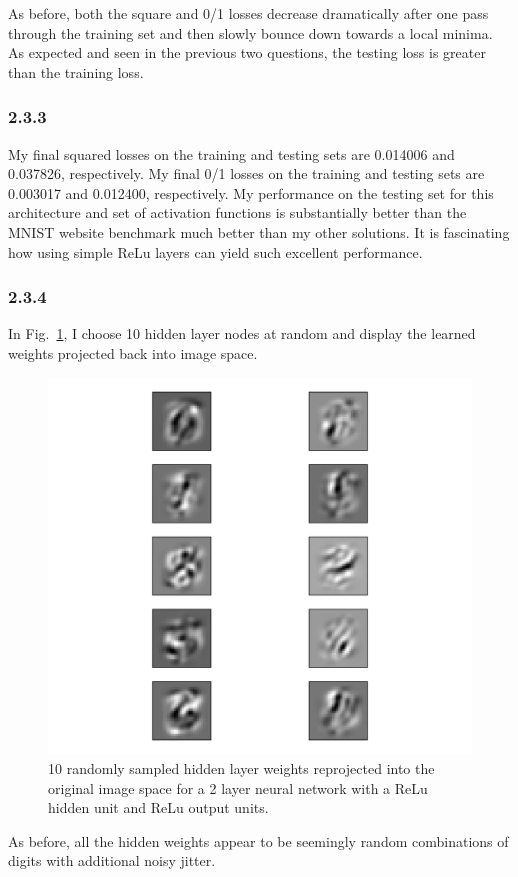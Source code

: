 \documentclass[12pt]{amsart}
\begin{document}
As before, both the square and 0/1 losses decrease dramatically after one pass through the training set and then slowly bounce down towards a local minima.  As expected and seen in the previous two questions, the testing loss is greater than the training loss.

\subsubsection*{2.3.3}
My final squared losses on the training and testing sets are 0.014006 and 0.037826, respectively.  My final 0/1 losses on the training and testing sets are 0.003017 and 0.012400, respectively.  My performance on the testing set for this architecture and set of activation functions is substantially better than the MNIST website benchmark much better than my other solutions.  It is fascinating how using simple ReLu layers can yield such excellent performance.

\subsubsection*{2.3.4}
In Fig.~\ref{fig:relu_relu_hidden}, I choose 10 hidden layer nodes at random and display the learned weights projected back into image space.
\begin{figure}[H]
	\includegraphics[width=\columnwidth]{relu_relu_hidden.pdf}
    \caption{10 randomly sampled hidden layer weights reprojected into the original image space for a 2 layer neural network with a ReLu hidden unit and ReLu output units.}
    \label{fig:relu_relu_hidden}
\end{figure}
As before, all the hidden weights appear to be seemingly random combinations of digits with additional noisy jitter.
\end{document}
